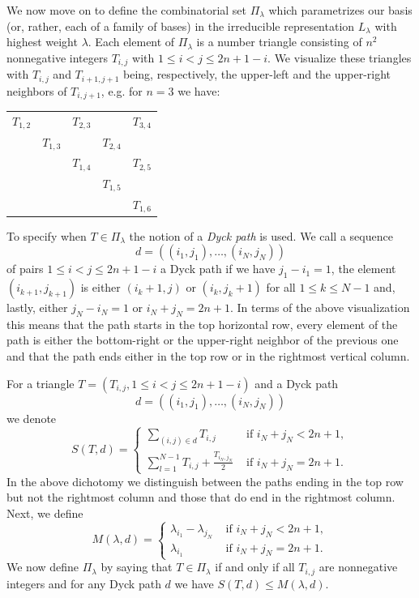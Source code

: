 \documentclass[ALCO,ThmDefs,Unicode]{cedram}
\newcommand{\la}{\lambda}
\begin{document}
We now move on to define the combinatorial set $\Pi_\lambda$ which parametrizes our basis (or, rather, each of a family of bases) in the irreducible representation $L_\la$ with highest weight $\la$. Each element of $\Pi_\la$ is a number triangle consisting of $n^2$ nonnegative integers $T_{i,j}$ with $1\le i<j \le 2n+1-i$. We visualize these triangles with $T_{i,j}$ and $T_{i+1,j+1}$ being, respectively, the upper-left and the upper-right neighbors of $T_{i,j+1}$, e.g. for $n=3$ we have:
\begin{center}
\begin{tabular}{ccccc}
$T_{1,2}$ && $T_{2,3}$ && $T_{3,4}$\\
&$T_{1,3}$ && $T_{2,4}$ & \\
&& $T_{1,4}$ && $T_{2,5}$ \\
&&& $T_{1,5}$ &\\
&&&& $T_{1,6}$
\end{tabular}
\end{center}
\vspace{2ex}

To specify when $T\in\Pi_\lambda$ the notion of a \emph{Dyck path} is used. We call a sequence
\[
d=((i_1,j_1),\dots,(i_N,j_N))
\]
of pairs $1\le i<j \le 2n+1-i$ a Dyck path if we have $j_1-i_1=1$, the element $(i_{k+1},j_{k+1})$ is either $(i_k+1,j)$ or $(i_k,j_k+1)$ for all $1\le k\le N-1$ and, lastly, either $j_N-i_N=1$ or $i_N+j_N=2n+1$. In terms of the above visualization this means that the path starts in the top horizontal row, every element of the path is either the bottom-right or the upper-right neighbor of the previous one and that the path ends either in the top row or in the rightmost vertical column.

For a triangle $T=(T_{i,j}, 1\le i<j \le 2n+1-i)$ and a Dyck path
\[
d=((i_1,j_1),\dots,(i_N,j_N))
\]
we denote
\[
S(T,d)=
\begin{cases}
\sum\limits_{(i,j)\in d} T_{i,j}&\text{ if }i_N+j_N<2n+1,\\[10pt]
\sum\limits_{l=1}^{N-1} T_{i,j}+\frac{T_{i_N,j_N}}2&\text{ if }i_N+j_N=2n+1.
\end{cases}
\]
In the above dichotomy we distinguish between the paths ending in the top row but not the rightmost column and those that do end in the rightmost column. Next, we define
\[
M(\lambda,d)=
\begin{cases}
\la_{i_1}-\la_{j_N}&\text{ if }i_N+j_N<2n+1,\\
\la_{i_1}&\text{ if }i_N+j_N=2n+1.
\end{cases}
\]
We now define $\Pi_\lambda$ by saying that $T\in\Pi_\lambda$ if and only if all $T_{i,j}$ are nonnegative integers and for any Dyck path $d$ we have $S(T,d)\le M(\lambda,d)$.
\end{document}
